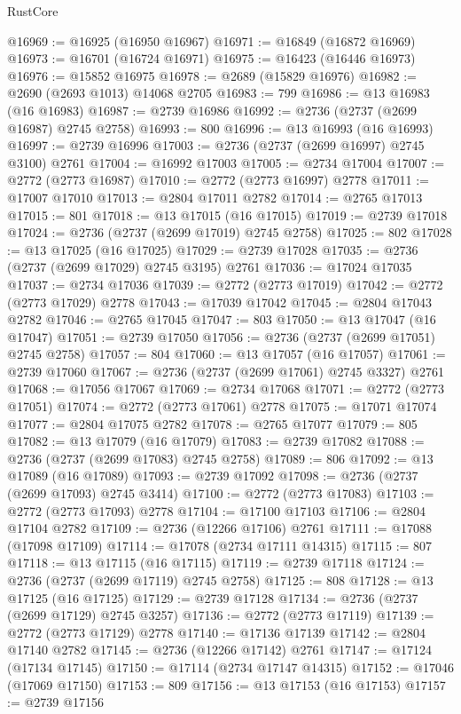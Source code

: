 \begin{lexlean}{RustCore}
\begin{coremodule}
@16969 := @16925 (@16950 @16967)
@16971 := @16849 (@16872 @16969)
@16973 := @16701 (@16724 @16971)
@16975 := @16423 (@16446 @16973)
@16976 := @15852 @16975
@16978 := @2689 (@15829 @16976)
@16982 := @2690 (@2693 @1013) @14068 @2705
@16983 := 799
@16986 := @13 @16983 (@16 @16983)
@16987 := @2739 @16986
@16992 := @2736 (@2737 (@2699 @16987) @2745 @2758)
@16993 := 800
@16996 := @13 @16993 (@16 @16993)
@16997 := @2739 @16996
@17003 := @2736 (@2737 (@2699 @16997) @2745 @3100) @2761
@17004 := @16992 @17003
@17005 := @2734 @17004
@17007 := @2772 (@2773 @16987)
@17010 := @2772 (@2773 @16997) @2778
@17011 := @17007 @17010
@17013 := @2804 @17011 @2782
@17014 := @2765 @17013
@17015 := 801
@17018 := @13 @17015 (@16 @17015)
@17019 := @2739 @17018
@17024 := @2736 (@2737 (@2699 @17019) @2745 @2758)
@17025 := 802
@17028 := @13 @17025 (@16 @17025)
@17029 := @2739 @17028
@17035 := @2736 (@2737 (@2699 @17029) @2745 @3195) @2761
@17036 := @17024 @17035
@17037 := @2734 @17036
@17039 := @2772 (@2773 @17019)
@17042 := @2772 (@2773 @17029) @2778
@17043 := @17039 @17042
@17045 := @2804 @17043 @2782
@17046 := @2765 @17045
@17047 := 803
@17050 := @13 @17047 (@16 @17047)
@17051 := @2739 @17050
@17056 := @2736 (@2737 (@2699 @17051) @2745 @2758)
@17057 := 804
@17060 := @13 @17057 (@16 @17057)
@17061 := @2739 @17060
@17067 := @2736 (@2737 (@2699 @17061) @2745 @3327) @2761
@17068 := @17056 @17067
@17069 := @2734 @17068
@17071 := @2772 (@2773 @17051)
@17074 := @2772 (@2773 @17061) @2778
@17075 := @17071 @17074
@17077 := @2804 @17075 @2782
@17078 := @2765 @17077
@17079 := 805
@17082 := @13 @17079 (@16 @17079)
@17083 := @2739 @17082
@17088 := @2736 (@2737 (@2699 @17083) @2745 @2758)
@17089 := 806
@17092 := @13 @17089 (@16 @17089)
@17093 := @2739 @17092
@17098 := @2736 (@2737 (@2699 @17093) @2745 @3414)
@17100 := @2772 (@2773 @17083)
@17103 := @2772 (@2773 @17093) @2778
@17104 := @17100 @17103
@17106 := @2804 @17104 @2782
@17109 := @2736 (@12266 @17106) @2761
@17111 := @17088 (@17098 @17109)
@17114 := @17078 (@2734 @17111 @14315)
@17115 := 807
@17118 := @13 @17115 (@16 @17115)
@17119 := @2739 @17118
@17124 := @2736 (@2737 (@2699 @17119) @2745 @2758)
@17125 := 808
@17128 := @13 @17125 (@16 @17125)
@17129 := @2739 @17128
@17134 := @2736 (@2737 (@2699 @17129) @2745 @3257)
@17136 := @2772 (@2773 @17119)
@17139 := @2772 (@2773 @17129) @2778
@17140 := @17136 @17139
@17142 := @2804 @17140 @2782
@17145 := @2736 (@12266 @17142) @2761
@17147 := @17124 (@17134 @17145)
@17150 := @17114 (@2734 @17147 @14315)
@17152 := @17046 (@17069 @17150)
@17153 := 809
@17156 := @13 @17153 (@16 @17153)
@17157 := @2739 @17156

\end{coremodule}
\end{lexlean}
